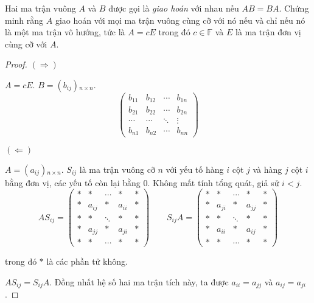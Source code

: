 \documentclass[class=nhvh-linear-algebra,crop=false]{standalone}
\begin{document}
\begin{exercise}
    Hai ma trận vuông $A$ và $B$ được gọi là \textit{giao hoán} với nhau nếu $AB = BA$. Chứng minh rằng $A$ giao hoán với mọi ma trận vuông cùng cỡ với nó nếu và chỉ nếu nó là một ma trận vô hướng, tức là $A = cE$ trong đó $c\in\mathbb{F}$ và $E$ là ma trận đơn vị cùng cỡ với $A$.
\end{exercise}

\begin{proof}
    $(\Rightarrow)$
    \par $A = cE$. $B = (b_{ij}){}_{n\times n}$.
    \[
        \begin{pmatrix}
            b_{11} & b_{12} & \cdots & b_{1n} \\
            b_{21} & b_{22} & \cdots & b_{2n} \\
            \cdots & \cdots & \ddots & \vdots \\
            b_{n1} & b_{n2} & \cdots & b_{nn}
        \end{pmatrix}
    \]
    \par $(\Leftarrow)$
    \par $A = (a_{ij}){}_{n\times n}$. $S_{ij}$ là ma trận vuông cỡ $n$ với yếu tố hàng $i$ cột $j$ và hàng $j$ cột $i$ bằng đơn vị, các yếu tố còn lại bằng $0$. Không mất tính tổng quát, giả sử $i < j$.
    \[
        AS_{ij} =
        \begin{pmatrix}
            * & *      & \cdots & *      & * \\
            * & a_{ij} & *      & a_{ii} & * \\
            * & *      & \ddots & *      & * \\
            * & a_{jj} & *      & a_{ji} & * \\
            * & *      & \cdots & *      & *
        \end{pmatrix}
        \qquad
        S_{ij}A =
        \begin{pmatrix}
            * & *      & \cdots & *      & * \\
            * & a_{ji} & *      & a_{jj} & * \\
            * & *      & \ddots & *      & * \\
            * & a_{ii} & *      & a_{ij} & * \\
            * & *      & \cdots & *      & *
        \end{pmatrix}
    \]
    \par trong đó $*$ là các phần tử không.
    \par $AS_{ij} = S_{ij}A$. Đồng nhất hệ số hai ma trận tích này, ta được $a_{ii} = a_{jj}$ và $a_{ij} = a_{ji}$.

\end{proof}
\end{document}
